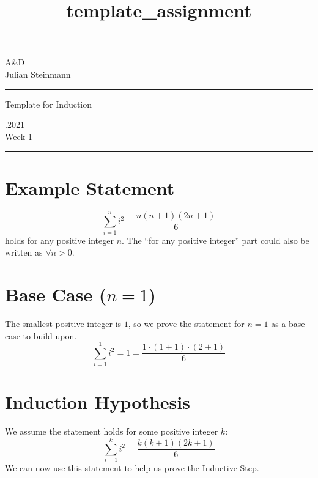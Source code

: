 \documentclass[a4paper,10pt]{article}
\begin{document}
  
  \title{template_assignment} %
  \fancyhead[C]{}
  \begin{minipage}{0.295\textwidth} %
    \raggedright
    A\&D \\ %
    \footnotesize 
    Julian Steinmann 
    \medskip\hrule
  \end{minipage}
  \begin{minipage}{0.4\textwidth} %
    \centering 
    \large
    Template for Induction 
    \normalsize
  \end{minipage}
  \begin{minipage}{0.295\textwidth} %
    .2021 \\ 
    \footnotesize 
    Week 1
    \medskip\hrule
  \end{minipage}
  
  \section*{Example Statement}
  \[\sum_{i=1}^{n} i^2 = \frac{n(n+1)(2n+1)}{6}\]
  holds for any positive integer \(n\). The ``for any positive integer'' part could also be written as \(\forall n > 0\).
  \section{Base Case (\texorpdfstring{\(n=1\)}{})}
  The smallest positive integer is \(1\), so we prove the statement for \(n=1\) as a base case to build upon.
  \[\sum_{i=1}^{1} i^2 = 1 = \frac{1 \cdot (1+1) \cdot (2+1)}{6}\]
  \section{Induction Hypothesis}
  We assume the statement holds for some positive integer \(k\):
  \[\sum_{i=1}^k i^2 = \frac{k(k+1)(2k+1)}{6}\]
  We can now use this statement to help us prove the Inductive Step.
\end{document}
